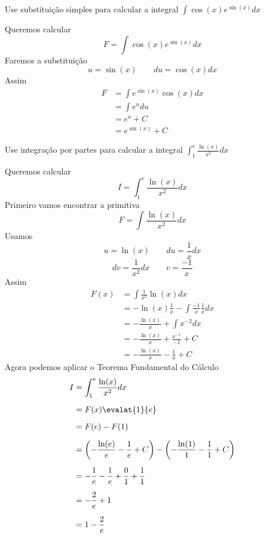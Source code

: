 \documentclass[a4paper,12pt,fleqn]{article}
\begin{document}

Use substituição simples para calcular a integral
\(
  \int \cos(x) e^{\sin(x)}dx
\)

\begin{answer}
  Queremos calcular
  \[
    F = \int \cos(x) e^{\sin(x)} dx
  \]
  Faremos a substituição
  \[
    u = \sin(x)
    \qquad
    du = \cos(x) dx
  \]
  Assim
  \begin{align*}
    F
    & = \int e^{\sin(x)} \cos(x) dx \\[2mm]
    & = \int e^{u} du \\[2mm]
    & = e^{u} + C \\[2mm]
    & = e^{\sin(x)} + C
  \end{align*}
  \clearpage
\end{answer}

Use integração por partes para calcular a integral
\(
  \int_1^e \frac{\ln(x)}{x^2} dx
\)

\begin{answer}
  Queremos calcular
  \[
    I = \int_1^e \frac{\ln(x)}{x^2} dx
  \]
  Primeiro vamos encontrar a primitiva
  \[
    F = \int \frac{\ln(x)}{x^2} dx
  \]
  Usamos
  \[
    u = \ln(x) \qquad du = \frac{1}{x} dx
  \]
  \[
    dv = \frac{1}{x^2}dx \qquad v = \frac{-1}{x}
  \]
  Assim
  \begin{align*}
    F(x)
    & = \int \frac{1}{x^2} \ln(x) dx \\[2mm]
    & = -\ln(x) \frac{1}{x} - \int \frac{-1}{x} \frac{1}{x} dx \\[2mm]
    & = -\frac{\ln(x)}{x} + \int x^{-2} dx \\[2mm]
    & = -\frac{\ln(x)}{x} + \frac{x^{-1}}{-1} + C \\[2mm]
    & = -\frac{\ln(x)}{x} - \frac{1}{x} + C
  \end{align*}
  Agora podemos aplicar o Teorema Fundamental do Cálculo
  \begin{align*}
    I
    & = \int_1^e \frac{\ln(x)}{x^2} dx \\[2mm]
    & = F(x)\evalat{1}{e} \\[2mm]
    & = F(e) - F(1) \\[2mm]
    & = \left(-\frac{\ln(e)}{e} - \frac{1}{e} + C\right)
      - \left(-\frac{\ln(1)}{1} - \frac{1}{1} + C\right) \\[2mm]
    & = -\frac{1}{e} - \frac{1}{e}
        +\frac{0}{1} + \frac{1}{1} \\[2mm]
    & = -\frac{2}{e} + 1 \\[2mm]
    & = 1 -\frac{2}{e}
  \end{align*}
  \clearpage
\end{answer}
\end{document}
